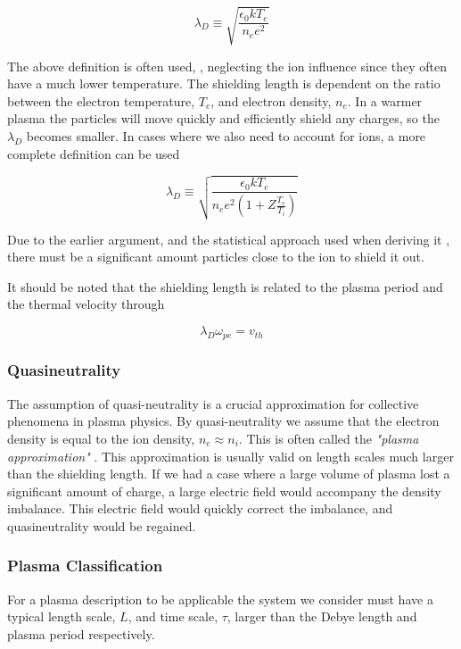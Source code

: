 		\begin{equation}
			\lambda_D \equiv \sqrt{\frac{\epsilon_0 kT_e}{n_e e^2}}
		\end{equation}

		The above definition is often used, \citep{pecseli_waves_2012},
		neglecting the ion influence since they often have a much lower temperature.
		The shielding length is dependent on the ratio between the electron temperature, \(T_e\),
		and electron density, \(n_e\). In a warmer plasma the particles will move quickly
		and efficiently shield any charges, so the \(\lambda_D\) becomes smaller.
		In cases where we also need to account for ions, a more complete definition can be used

		\begin{equation}
			\lambda_D \equiv \sqrt{\frac{\epsilon_0 k T_e}{n_e e^2(1+Z \frac{T_e}{T_i})}}
		\end{equation}

		Due to the earlier argument, and the statistical approach used when deriving it \citep{goldston_introduction_1995},
		there must be a significant amount particles close to the ion to shield it out.

		It should be noted that the shielding length is related \citep{fitzpatrick_plasma_2014} to
		the plasma period and the thermal velocity through

		\begin{equation}
			\lambda_D \omega_{pe} = v_{th}
		\end{equation}


		\subsubsection{Quasineutrality}
		The assumption of quasi-neutrality is a crucial approximation for collective phenomena in plasma
		physics. By quasi-neutrality we assume that the electron
		density is equal to the ion density, \(n_e \approx n_i\). This is often called the
		\textit{"plasma approximation"} \citep{chen_introduction_1984}.
		This approximation is usually valid on length scales much larger than the shielding
		length. If we had a case where a large volume of plasma lost a significant
		amount of charge, a large electric field would accompany the density imbalance.
		This electric field would quickly correct the imbalance, and quasineutrality
		would be regained.

		\subsubsection{Plasma Classification}
        For a plasma description to be applicable the system we consider must have
        a typical length scale, \(L\), and time scale, \(\tau\), larger than the Debye length and plasma
        period respectively.


